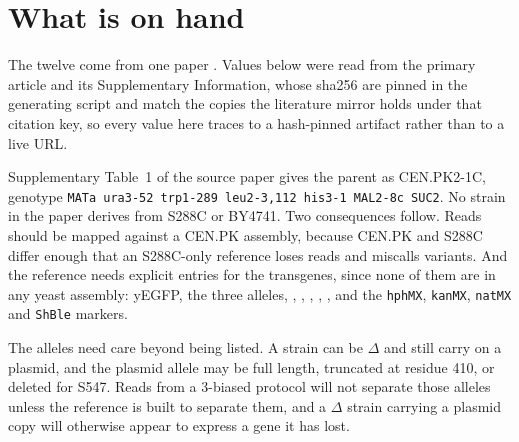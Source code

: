
\section{What is on hand}\label{sec:onhand}

The twelve come from one paper .
Values below were read from the primary article and its Supplementary
Information, whose sha256 are pinned in the generating script and match the
copies the literature mirror holds under that citation key, so every value here
traces to a hash-pinned artifact rather than to a live URL.

Supplementary Table~1 of the source paper gives the parent as
 CEN.PK2-1C, genotype \texttt{MATa ura3-52 trp1-289
leu2-3,112 his3-1 MAL2-8c SUC2}. No strain in the paper derives from S288C or
BY4741. Two consequences follow. Reads should be mapped against a CEN.PK
assembly, because CEN.PK and S288C differ enough that an S288C-only reference
loses reads and miscalls variants. And the reference needs explicit entries for
the transgenes, since none of them are in any yeast assembly: yEGFP, the three
 alleles, , ,
, , , and the
\texttt{hphMX}, \texttt{kanMX}, \texttt{natMX} and \texttt{ShBle} markers.

The  alleles need care beyond being listed. A strain can be
$\Delta$ and still carry  on a plasmid, and the plasmid
allele may be full length, truncated at residue 410, or deleted for S547. Reads
from a 3\gsup{\textquotesingle}-biased protocol will not separate those alleles
unless the reference is built to separate them, and a $\Delta$ strain
carrying a plasmid copy will otherwise appear to express a gene it has lost.

